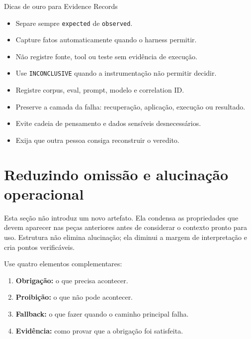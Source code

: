 \documentclass[
  10pt,
  a4paper,
  oneside]{book}
\providecommand{\tightlist}{%
  \setlength{\itemsep}{0pt}\setlength{\parskip}{0pt}}
\begin{document}
\begin{tipbox}{Dicas de ouro para Evidence Records}

\begin{itemize}
\tightlist
\item
  Separe sempre \texttt{expected} de \texttt{observed}.
\item
  Capture fatos automaticamente quando o harness permitir.
\item
  Não registre fonte, tool ou teste sem evidência de execução.
\item
  Use \texttt{INCONCLUSIVE} quando a instrumentação não permitir
  decidir.
\item
  Registre corpus, eval, prompt, modelo e correlation ID.
\item
  Preserve a camada da falha: recuperação, aplicação, execução ou
  resultado.
\item
  Evite cadeia de pensamento e dados sensíveis desnecessários.
\item
  Exija que outra pessoa consiga reconstruir o veredito.
\end{itemize}

\end{tipbox}

\hypertarget{reduzindo-omissuxe3o-e-alucinauxe7uxe3o-operacional}{%
\section{Reduzindo omissão e alucinação
operacional}\label{reduzindo-omissuxe3o-e-alucinauxe7uxe3o-operacional}}

Esta seção não introduz um novo artefato. Ela condensa as propriedades
que devem aparecer nas peças anteriores antes de considerar o contexto
pronto para uso. Estrutura não elimina alucinação; ela diminui a margem
de interpretação e cria pontos verificáveis.

Use quatro elementos complementares:

\begin{enumerate}
\def\labelenumi{\arabic{enumi}.}
\tightlist
\item
  \textbf{Obrigação:} o que precisa acontecer.
\item
  \textbf{Proibição:} o que não pode acontecer.
\item
  \textbf{Fallback:} o que fazer quando o caminho principal falha.
\item
  \textbf{Evidência:} como provar que a obrigação foi satisfeita.
\end{enumerate}
\end{document}
